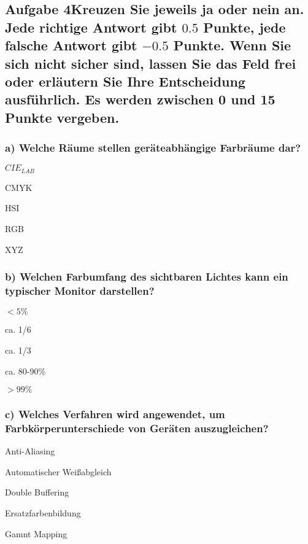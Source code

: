 \documentclass[10pt, a4paper]{article}
\begin{document}
\subsection{Aufgabe 4\newline Kreuzen Sie jeweils ja oder nein an. Jede richtige Antwort gibt $0.5$ Punkte, jede falsche Antwort gibt $-0.5$ Punkte. Wenn Sie sich nicht sicher sind, lassen Sie das Feld frei oder erläutern Sie Ihre Entscheidung ausführlich. Es werden zwischen 0 und 15 Punkte vergeben.}
\subsubsection{a) Welche Räume stellen geräteabhängige Farbräume dar?}
\begin{multicols}{3}
    \begin{todolist}
        \item $CIE_{LAB}$
        \item CMYK
        \item HSI
        \item RGB
        \item XYZ
    \end{todolist}
\end{multicols}

\subsubsection{b) Welchen Farbumfang des sichtbaren Lichtes kann ein typischer Monitor darstellen?}
\begin{multicols}{3}
    \begin{todolist}
        \item $<5\%$
        \item ca. 1/6
        \item ca. 1/3
        \item ca. 80-90\%
        \item $>99\%$
    \end{todolist}
\end{multicols}

\subsubsection{c) Welches Verfahren wird angewendet, um Farbkörperunterschiede von Geräten auszugleichen?}
\begin{multicols}{3}
    \begin{todolist}
        \item Anti-Aliasing
        \item Automatischer Weißabgleich
        \item Double Buffering
        \item Ersatzfarbenbildung
        \item Gamnt Mapping
    \end{todolist}
\end{multicols}
\end{document}
